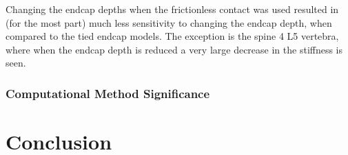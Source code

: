 Changing the endcap depths when the frictionless contact was used resulted in
(for the most part) much less sensitivity to changing the endcap depth, when
compared to the tied endcap models. The exception is the spine 4 L5 vertebra,
where when the endcap depth is reduced a very large decrease in the stiffness
is seen.

\subsubsection{Computational Method Significance}

\section{Conclusion}







